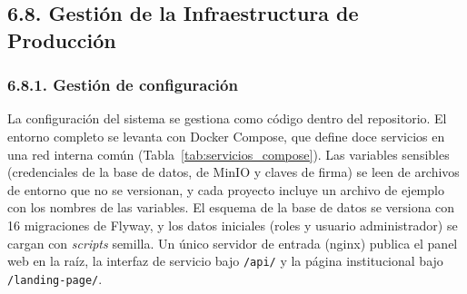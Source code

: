 
\subsection{6.8. Gestión de la Infraestructura de Producción}

\subsubsection{6.8.1. Gestión de configuración}

La configuración del sistema se gestiona como código dentro del repositorio. El entorno completo se levanta con Docker Compose, que define doce servicios en una red interna común (Tabla~\ref{tab:servicios_compose}). Las variables sensibles (credenciales de la base de datos, de MinIO y claves de firma) se leen de archivos de entorno que no se versionan, y cada proyecto incluye un archivo de ejemplo con los nombres de las variables. El esquema de la base de datos se versiona con 16 migraciones de Flyway, y los datos iniciales (roles y usuario administrador) se cargan con \textit{scripts} semilla. Un único servidor de entrada (nginx) publica el panel web en la raíz, la interfaz de servicio bajo \texttt{/api/} y la página institucional bajo \texttt{/landing-page/}.

